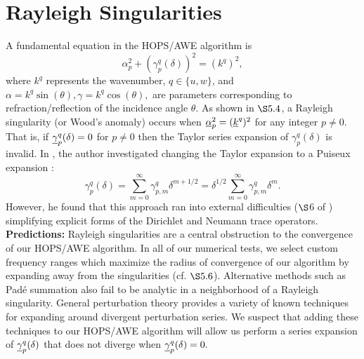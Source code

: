 \section{Rayleigh Singularities}
\label{Sec: Rayleigh Singularities}
A fundamental equation in the HOPS/AWE algorithm is
$$\alpha_p^2 + (\gamma_p^q(\delta))^2 = (k^q)^2,$$
where $k^q$ represents the wavenumber, $q\in\{u,w\}$, and $\alpha=k^q\sin(\theta), \gamma=k^q\cos(\theta),$ are parameters corresponding to refraction/reflection of the incidence angle $\theta$. As shown in $\S 5.4$, a Rayleigh singularity (or Wood's anomaly) occurs when $\underline{\alpha}_p^2 = (\underline{k}^q)^2$ for any integer $p\neq 0$. That is, if $\underline{\gamma}_p^q(\delta) =0$ for $p\neq 0$ then the Taylor series expansion of $\gamma_p^q(\delta)$ is invalid. In \cite{Nicholls16}, the author investigated changing the Taylor expansion to a Puiseux expansion \cite{basu2007algorithms}:
$$\gamma_p^q(\delta)=\sum_{m=0}^{\infty}\gamma_{p,m}^q\delta^{m+1/2}=\delta^{1/2}\sum_{m=0}^{\infty}\gamma_{p,m}^q\delta^m.$$
However, he found that this approach ran into external difficulties ($\S$6 of \cite{Nicholls16}) simplifying explicit forms of the Dirichlet and Neumann trace operators.
\newline
\\
\textbf{Predictions:} Rayleigh singularities are a central obstruction to the convergence of our HOPS/AWE algorithm. In all of our numerical tests, we select custom frequency ranges which maximize the radius of convergence of our algorithm by expanding away from the singularities (cf. $\S 5.6$). Alternative methods such as Padé summation also fail to be analytic in a neighborhood of a Rayleigh singularity. General perturbation theory provides a variety of known techniques \cite{suslov2005divergent,convfromdiv,Heinz2020,dienes1957taylor,arteca1984summation} for expanding around divergent perturbation series. We suspect that adding these techniques to our HOPS/AWE algorithm will allow us perform a series expansion of $\underline{\gamma}_p^q(\delta)$ that does not diverge when $\underline{\gamma}_p^q(\delta)=0.$